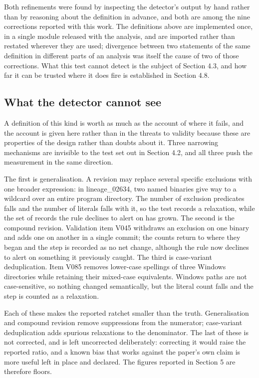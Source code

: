 Both refinements were found by inspecting the detector's output by hand rather than by reasoning about the definition in advance, and both are among the nine corrections reported with this work. The definitions above are implemented once, in a single module released with the analysis, and are imported rather than restated wherever they are used; divergence between two statements of the same definition in different parts of an analysis was itself the cause of two of those corrections. What this test cannot detect is the subject of Section 4.3, and how far it can be trusted where it does fire is established in Section 4.8.

\subsection{What the detector cannot see}
\label{sec:cannotsee}

A definition of this kind is worth as much as the account of where it fails, and the account is given here rather than in the threats to validity because these are properties of the design rather than doubts about it. Three narrowing mechanisms are invisible to the test set out in Section 4.2, and all three push the measurement in the same direction.

The first is generalisation. A revision may replace several specific exclusions with one broader expression: in lineage\_02634, two named binaries give way to a wildcard over an entire program directory. The number of exclusion predicates falls and the number of literals falls with it, so the test records a relaxation, while the set of records the rule declines to alert on has grown. The second is the compound revision. Validation item V045 withdraws an exclusion on one binary and adds one on another in a single commit; the counts return to where they began and the step is recorded as no net change, although the rule now declines to alert on something it previously caught. The third is case-variant deduplication. Item V085 removes lower-case spellings of three Windows directories while retaining their mixed-case equivalents. Windows paths are not case-sensitive, so nothing changed semantically, but the literal count falls and the step is counted as a relaxation.

Each of these makes the reported ratchet smaller than the truth. Generalisation and compound revision remove suppressions from the numerator; case-variant deduplication adds spurious relaxations to the denominator. The last of these is not corrected, and is left uncorrected deliberately: correcting it would raise the reported ratio, and a known bias that works against the paper's own claim is more useful left in place and declared. The figures reported in Section 5 are therefore floors.

